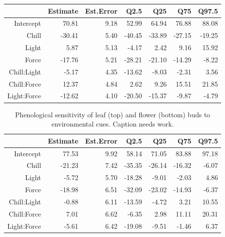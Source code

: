 \documentclass{article}\usepackage[]{graphicx}\usepackage[]{color}
\begin{document}
\begin{table}[ht]
\centering
\begin{tabular}{rrrrrrr}
  \hline
 & Estimate & Est.Error & Q2.5 & Q25 & Q75 & Q97.5 \\ 
  \hline
Intercept & 70.81 & 9.18 & 52.99 & 64.94 & 76.88 & 88.08 \\ 
  Chill & -30.41 & 5.40 & -40.45 & -33.89 & -27.15 & -19.25 \\ 
  Light & 5.87 & 5.13 & -4.17 & 2.42 & 9.16 & 15.92 \\ 
  Force & -17.76 & 5.21 & -28.21 & -21.10 & -14.29 & -8.22 \\ 
  Chill:Light & -5.17 & 4.35 & -13.62 & -8.03 & -2.31 & 3.56 \\ 
  Chill:Force & 12.37 & 4.84 & 2.62 & 9.26 & 15.51 & 21.85 \\ 
  Light:Force & -12.62 & 4.10 & -20.50 & -15.37 & -9.87 & -4.79 \\ 
   \hline
\end{tabular}
\end{table}
\begin{table}[ht]
\centering
\begin{tabular}{rrrrrrr}
  \hline
 & Estimate & Est.Error & Q2.5 & Q25 & Q75 & Q97.5 \\ 
  \hline
Intercept & 77.53 & 9.92 & 58.14 & 71.05 & 83.88 & 97.18 \\ 
  Chill & -21.23 & 7.42 & -35.35 & -26.14 & -16.32 & -6.07 \\ 
  Light & -5.72 & 5.70 & -18.28 & -9.01 & -2.03 & 4.86 \\ 
  Force & -18.98 & 6.51 & -32.09 & -23.02 & -14.93 & -6.37 \\ 
  Chill:Light & -0.88 & 6.11 & -13.59 & -4.72 & 3.21 & 10.55 \\ 
  Chill:Force & 7.01 & 6.62 & -6.35 & 2.98 & 11.11 & 20.31 \\ 
  Light:Force & -5.61 & 6.42 & -19.08 & -9.51 & -1.46 & 6.37 \\ 
   \hline
\end{tabular}
\caption{Phenological sensitivity of leaf (top) and flower (bottom) buds to environmental cues. Caption needs work.} 
\label{tab:modelests}
\end{table}
\end{document}
